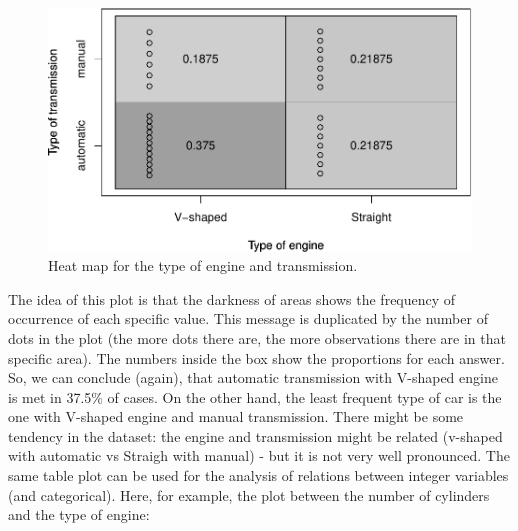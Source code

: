 \documentclass[
]{book}
\newenvironment{Shaded}{\begin{snugshade}}{\end{snugshade}}
\newcommand{\AttributeTok}[1]{\textcolor[rgb]{0.13,0.29,0.53}{#1}}
\newcommand{\FunctionTok}[1]{\textcolor[rgb]{0.13,0.29,0.53}{\textbf{#1}}}
\newcommand{\NormalTok}[1]{#1}
\newcommand{\SpecialCharTok}[1]{\textcolor[rgb]{0.81,0.36,0.00}{\textbf{#1}}}
\newcommand{\StringTok}[1]{\textcolor[rgb]{0.31,0.60,0.02}{#1}}
\theoremstyle{definition}
\theoremstyle{definition}
\theoremstyle{definition}
\theoremstyle{definition}
\theoremstyle{remark}
\begin{document}
\begin{figure}
\centering
\includegraphics{Svetunkov---Statistics-for-Business-Analytics_files/figure-latex/tableplotVSAM-1.pdf}
\caption{\label{fig:tableplotVSAM}Heat map for the type of engine and transmission.}
\end{figure}

The idea of this plot is that the darkness of areas shows the frequency of occurrence of each specific value. This message is duplicated by the number of dots in the plot (the more dots there are, the more observations there are in that specific area). The numbers inside the box show the proportions for each answer. So, we can conclude (again), that automatic transmission with V-shaped engine is met in 37.5\% of cases. On the other hand, the least frequent type of car is the one with V-shaped engine and manual transmission. There might be some tendency in the dataset: the engine and transmission might be related (v-shaped with automatic vs Straigh with manual) - but it is not very well pronounced. The same table plot can be used for the analysis of relations between integer variables (and categorical). Here, for example, the plot between the number of cylinders and the type of engine:

\begin{Shaded}
\end{Shaded}
\end{document}
